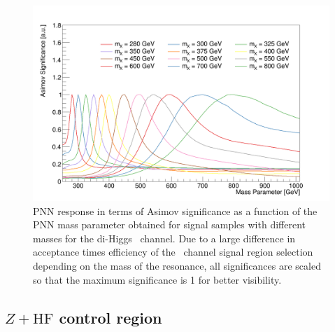 \begin{figure}[!htbp]
    \centering
    \includegraphics[width=0.85\linewidth]{DiHiggs/plots/mass_response.png}
    \caption{
        PNN response in terms of Asimov significance as a function of the PNN mass parameter obtained for
signal samples with different masses for the di-Higgs \lephad\ channel. Due to a large difference in acceptance times
efficiency of the \lephad\ channel signal region selection depending on the mass of the resonance, 
all significances are scaled so that the maximum significance is 1 for better visibility.}
    \label{fig:MVA:mass-response}
    \end{figure}

\subsection{$Z+\text{HF}$ control region}
\label{sec:selection:zcr}

